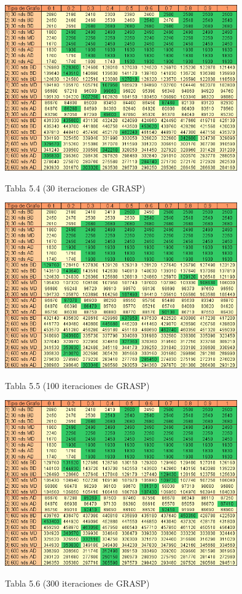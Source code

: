 \documentclass[a4paper,11pt] {article}
\begin{document}
\begin{center}
 \includegraphics[width=0.75\textwidth]{tablas/tablaGrasp30-2.png}
\begin{center}
Tabla 5.4 (30 iteraciones de GRASP)
\end{center}
\end{center}
\begin{center}
 \includegraphics[width=0.75\textwidth]{tablas/tablaGrasp100-2.png}
\begin{center}
Tabla 5.5 (100 iteraciones de GRASP)
\end{center}
\end{center}
\begin{center}
 \includegraphics[width=0.75\textwidth]{tablas/tablaGrasp300-2.png}
\begin{center}
Tabla 5.6 (300 iteraciones de GRASP)
\end{center}
\end{center}
\end{document}
